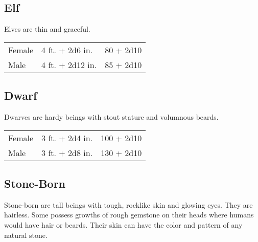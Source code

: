 \begin{multicols}{2}
\subsection{Elf}

Elves are thin and graceful.

\begin{center}
{
\begin{xtabular}{|l|l|l|}
Female & 4 ft. + 2d6 in. & 80 + 2d10 \\
Male & 4 ft. + 2d12 in. & 85 + 2d10 \\
\hline
\end{xtabular}
}
\end{center}

\subsection{Dwarf}

Dwarves are hardy beings with stout stature and volumnous beards.

\begin{center}
{
\begin{xtabular}{|l|l|l|}
Female & 3 ft. + 2d4 in. & 100 + 2d10 \\
Male & 3 ft. + 2d8 in. & 130 + 2d10 \\
\hline
\end{xtabular}
}
\end{center}

\subsection{Stone-Born}

Stone-born are tall beings with tough, rocklike skin and glowing eyes. They are hairless. Some
possess growths of rough gemstone on their heads where humans would have hair or beards. Their
skin can have the color and pattern of any natural stone.


\end{multicols}

